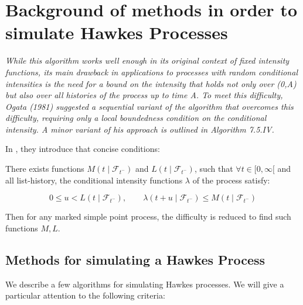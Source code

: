 \chapter{Background of methods in order to simulate Hawkes Processes}
\label{appendix_simulate}





\textit{While this algorithm works well enough in its original context of fixed intensity
functions, its main drawback in applications to processes with random
conditional intensities is the need for a bound on the intensity that holds not
only over (0,A) but also over all histories of the process up to time A. To meet
this difficulty, Ogata (1981) suggested a sequential variant of the algorithm
that overcomes this difficulty, requiring only a local boundedness condition
on the conditional intensity. A minor variant of his approach is outlined in
Algorithm 7.5.IV.
}


In \cite{daley}, they introduce that concise conditions:

There exists functions $M(t \mid \mathcal F_{t^-} )$ and $L(t \mid \mathcal F_{t^-} )$, such that $\forall t \in [0, \infty [$ and all list-history, the conditional intensity functions $\lambda$ of the process satisfy:

$$ 0 \leq u < L(t \mid \mathcal F_{t^-} ), \qquad  \lambda( t + u  \mid \mathcal F_{t^-} )  \leq M( t \mid \mathcal F_{t^-} )  $$

Then for any marked simple point process, the difficulty is reduced to find such functions $M,L$. 


\section{Methods for simulating a Hawkes Process}
\label{section:definition_algo}
We describe a few algorithms for simulating Hawkes processes. We will give a particular attention to the following criteria:

